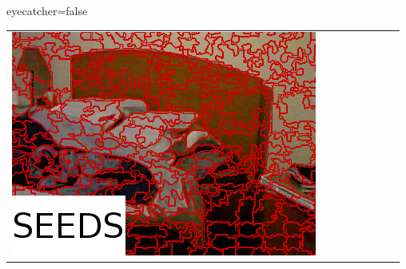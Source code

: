 \documentclass[portrait,final,a0paper,fontscale=0.28]{baposter}
\begin{document}
\begin{poster}{eyecatcher=false}
{\begin{tabularx}{\linewidth}{@{}Y@{}Y@{}Y@{}Y@{}Y@{}Y@{}Y@{}Y@{}}
{                \includegraphics{pictures/nyu-test-2-oriseedsmp-excerpt}
            }
            &
            &
            &
            \resizebox{\linewidth}{!}{
}
\end{tabularx}}
\end{poster}
\end{document}
